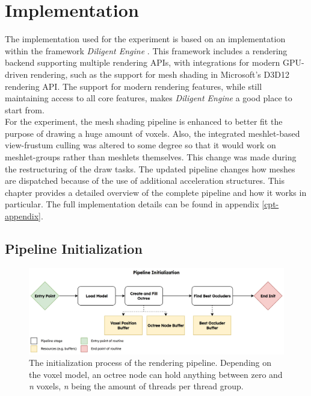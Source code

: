 \chapter{Implementation} \label{cpt-implementation}

The implementation used for the experiment is based on an implementation within the framework \emph{Diligent Engine} 
\cite{DiligentGraphicsGitHub, DiligentGraphics}. This framework includes a rendering backend supporting 
multiple rendering \ac{API}s, with integrations for modern \ac{GPU}-driven rendering, such as the support for 
mesh shading in Microsoft's D3D12 rendering \ac{API}. The support for modern rendering features, while still 
maintaining access to all core features, makes \emph{Diligent Engine} a good place to start from.\\

\noindent
For the experiment, the mesh shading pipeline is enhanced to better fit the purpose of drawing a huge amount of voxels. 
Also, the integrated meshlet-based view-frustum culling was altered to some degree so that it would work on meshlet-groups 
rather than meshlets themselves. This change was made during the restructuring of the draw tasks. The updated pipeline 
changes how meshes are dispatched because of the use of additional acceleration structures. This chapter provides 
a detailed overview of the complete pipeline and how it works in particular. The full implementation details can be 
found in appendix \ref{cpt-appendix}.

\section{Pipeline Initialization} \label{sec-piepline-initialization}

\begin{figure}[h]
    \centering
    \includegraphics[width=\linewidth]{images/graphics/pipeline-initialization.jpg}
    \caption{The initialization process of the rendering pipeline. Depending on the voxel model, an octree node 
    can hold anything between zero and \emph{n} voxels, \emph{n} being the amount of threads per thread group.}
    \label{fig:pipeline-initialization}
\end{figure}

